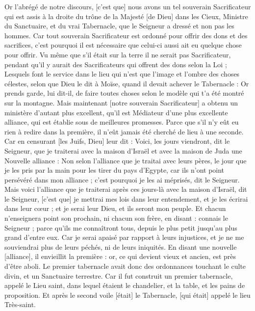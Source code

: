 \begin{multicols}{2}
\VerseOne{}Or l'abrégé de notre discours, [c'est que] nous avons un tel souverain Sacrificateur qui est assis à la droite du trône de la Majesté [de Dieu] dans les Cieux,
Ministre du Sanctuaire, et du vrai Tabernacle, que le Seigneur a dressé et non pas les hommes.
Car tout souverain Sacrificateur est ordonné pour offrir des dons et des sacrifices, c'est pourquoi il est nécessaire que celui-ci aussi ait eu quelque chose pour offrir.
Vu même que s'il était sur la terre il ne serait pas Sacrificateur, pendant qu'il y aurait des Sacrificateurs qui offrent des dons selon la Loi ;
Lesquels font le service dans le lieu qui n'est que l'image et l'ombre des choses célestes, selon que Dieu le dit à Moïse, quand il devait achever le Tabernacle : Or prends garde, lui dit-il, de faire toutes choses selon le modèle qui t'a été montré sur la montagne.
Mais maintenant [notre souverain Sacrificateur] a obtenu un ministère d'autant plus excellent, qu'il est Médiateur d'une plus excellente alliance, qui est établie sous de meilleures promesses.
Parce que s'il n'y eût eu rien à redire dans la première, il n'eût jamais été cherché de lieu à une seconde.
Car en censurant [les Juifs, Dieu] leur dit : Voici, les jours viendront, dit le Seigneur, que je traiterai avec la maison d'Israël et avec la maison de Juda une Nouvelle alliance :
Non selon l'alliance que je traitai avec leurs pères, le jour que je les pris par la main pour les tirer du pays d'Egypte, car ils n'ont point persévéré dans mon alliance ; c'est pourquoi je les ai méprisés, dit le Seigneur.
Mais voici l'alliance que je traiterai après ces jours-là avec la maison d'Israël, dit le Seigneur, [c'est que] je mettrai mes lois dans leur entendement, et je les écrirai dans leur cœur ; et je serai leur Dieu, et ils seront mon peuple.
Et chacun n'enseignera point son prochain, ni chacun son frère, en disant : connais le Seigneur ; parce qu'ils me connaîtront tous, depuis le plus petit jusqu'au plus grand d'entre eux.
Car je serai apaisé par rapport à leurs injustices, et je ne me souviendrai plus de leurs péchés, ni de leurs iniquités.
En disant une nouvelle [alliance], il envieillit la première : or, ce qui devient vieux et ancien, est près d'être aboli.
\VerseOne{}Le premier tabernacle avait donc des ordonnances touchant le culte divin, et un Sanctuaire terrestre.
Car il fut construit un premier tabernacle, appelé le Lieu saint, dans lequel étaient le chandelier, et la table, et les pains de proposition.
Et après le second voile [était] le Tabernacle, [qui était] appelé le lieu Très-saint.

\end{multicols}
